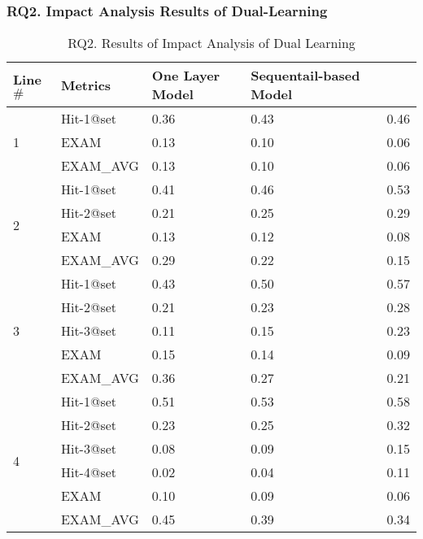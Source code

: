 \subsubsection{\bf RQ2. Impact Analysis Results of Dual-Learning}

\iffalse

\begin{table}[b]
	\caption{RQ2. Results of Impact Analysis of Dual Learning}
        \vspace{-12pt}
	{\footnotesize
		\begin{center}
			\renewcommand{\arraystretch}{1}
			\begin{tabular}{p{1cm}<{\centering}|p{1.5cm}<{\centering}|p{1.5cm}<{\centering}|p{1.5cm}<{\centering}|p{1.2cm}<{\centering}}
				\hline
				Line$\#$ & Metrics & One Layer Model & Sequentail-based Model & \tool \\
				\hline
				\multirow{3}{*}{1}  & Hit-1@set     & 0.36 & 0.43 & 0.46  \\
									& EXAM          & 0.13 & 0.10 & 0.06  \\
									& EXAM\_AVG     & 0.13 & 0.10 & 0.06  \\
				\hline
				\multirow{4}{*}{2}  & Hit-1@set     & 0.41 & 0.46 & 0.53  \\
									& Hit-2@set     & 0.21 & 0.25 & 0.29  \\
									& EXAM          & 0.13 & 0.12 & 0.08  \\
									& EXAM\_AVG     & 0.29 & 0.22 & 0.15 \\
				\hline
				\multirow{5}{*}{3}  & Hit-1@set     & 0.43 & 0.50 & 0.57 \\
									& Hit-2@set     & 0.21 & 0.23 & 0.28 \\
									& Hit-3@set     & 0.11 & 0.15 & 0.23 \\
									& EXAM          & 0.15 & 0.14 & 0.09 \\
									& EXAM\_AVG     & 0.36 & 0.27 & 0.21 \\
				\hline
				\multirow{6}{*}{4}  & Hit-1@set     & 0.51 & 0.53 & 0.58 \\
									& Hit-2@set     & 0.23 & 0.25 & 0.32 \\
									& Hit-3@set     & 0.08 & 0.09 & 0.15 \\
									& Hit-4@set     & 0.02 & 0.04 & 0.11 \\
									& EXAM          & 0.10 & 0.09 & 0.06 \\
									& EXAM\_AVG     & 0.45 & 0.39 & 0.34 \\

\end{tabular}
\end{center}}
\end{table}
